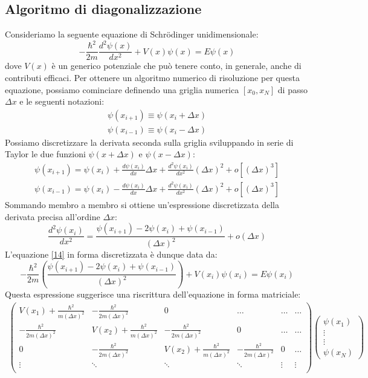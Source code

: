 \documentclass[11pt,a4paper]{article}
\begin{document}
\subsection{Algoritmo di diagonalizzazione}
Consideriamo la seguente equazione di Schr\"{o}dinger unidimensionale:
\begin{equation}\label{14}
-\frac{\hbar^2}{2m}\frac{d^2\psi(x)}{dx^2} + V(x)\psi(x)=E\psi(x)
\end{equation}
dove $V(x)$ è un generico potenziale che può tenere conto, in generale, anche di contributi efficaci. Per ottenere un algoritmo numerico di risoluzione per questa equazione, possiamo cominciare definendo una griglia numerica $[x_0,x_N]$ di passo $\Delta x$ e le seguenti notazioni:
\begin{align*}
\psi(x_{i+1}) \equiv \psi(x_i + \Delta x)  \\
\psi(x_{i-1}) \equiv \psi(x_i - \Delta x)
\end{align*}
Possiamo discretizzare la derivata seconda sulla griglia sviluppando in serie di Taylor le due funzioni $\psi(x+\Delta x)$ e $\psi(x-\Delta x)$:
\begin{align*}
\psi(x_{i+1}) = \psi(x_i) + \frac{d\psi(x_i)}{dx}\Delta x + \frac{d^2 \psi(x_i)}{dx^2}(\Delta x)^2 + o[(\Delta x)^3] \\
\psi(x_{i-1}) = \psi(x_i) - \frac{d\psi(x_i)}{dx}\Delta x + \frac{d^2 \psi(x_i)}{dx^2}(\Delta x)^2 + o[(\Delta x)^3]
\end{align*}
Sommando membro a membro si ottiene un'espressione discretizzata della derivata precisa all'ordine $\Delta x$:
\begin{equation}
\frac{d^2 \psi(x_i)}{dx^2} = \frac{\psi(x_{i+1}) - 2\psi(x_i) + \psi(x_{i-1})}{(\Delta x)^2} + o(\Delta x)
\end{equation}
L'equazione \eqref{14} in forma discretizzata è dunque data da:
\begin{equation}
-\frac{\hbar^2}{2m} \left( \frac{\psi(x_{i+1}) - 2\psi(x_i) + \psi(x_{i-1})}{(\Delta x)^2} \right) + V(x_i)\psi(x_i) = E\psi(x_i)
\end{equation}
Questa espressione suggerisce una riscrittura dell'equazione in forma matriciale:
\[
\begin{split}
\left( \begin{array}{cccccc}
V(x_1) + \frac{\hbar^2}{m(\Delta x)^2} & -\frac{\hbar^2}{2m(\Delta x)^2} & 0 & \ldots & \ldots & \ldots  \\
-\frac{\hbar^2}{2m(\Delta x)^2} & V(x_2) + \frac{\hbar^2}{m(\Delta x)^2} & -\frac{\hbar^2}{2m(\Delta x)^2} & 0 & \ldots & \ldots \\
0 & -\frac{\hbar^2}{2m(\Delta x)^2} & V(x_2) + \frac{\hbar^2}{m(\Delta x)^2} & -\frac{\hbar^2}{2m(\Delta x)^2} & 0 & \ldots \\
\vdots & \ddots & \ddots & \ddots & \vdots & \vdots \\
\end{array}\right) 
\left( \begin{array}{c}
\psi(x_1) \\ \vdots \\ \vdots \\ \psi(x_N)
\end{array} \right)  
\end{split}
\]
\end{document}

